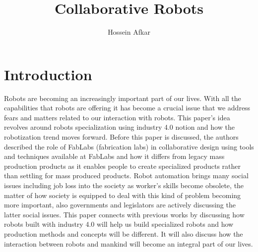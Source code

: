 \documentclass[a4paper, 11pt]{article}
\title{Collaborative Robots}
\author{Hossein Afkar}
\begin{document}
\maketitle

\section{Introduction}
Robots are becoming an increasingly important part of our lives.
With all the capabilities that robots are offering it has become
a crucial issue that we address fears and matters related to our
interaction with robots. This paper's idea revolves around robots
specialization using industry 4.0 notion and how the robotization trend
moves forward. Before this paper is discussed, the authors described the role of
FabLabs (fabrication labs) in collaborative design using tools and techniques
available at FabLabs and how it differs from legacy mass production products as
it enables people to create specialized products rather than settling for mass
produced products.
Robot automation brings many social issues including job loss into the society
as worker's skills become obsolete, the matter of how society is equipped to
deal with this kind of problem becoming more important, also governments and
legislators are actively discussing the latter social issues.
This paper connects with previous works by discussing how robots built with
industry 4.0 will help us build specialized robots and how production methods
and concepts will be different. It will also discuss how the interaction
between robots and mankind will become an integral part of our lives.
\end{document}
